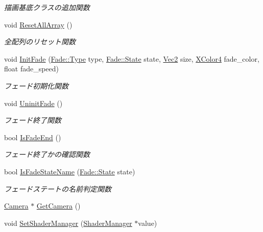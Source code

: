 \begin{DoxyCompactItemize}
\begin{DoxyCompactList}\small\item\em 描画基底クラスの追加関数 \end{DoxyCompactList}\item 
void \mbox{\hyperlink{class_back_buffer_a04e942576ac5de94d16764d347111234}{Reset\+All\+Array}} ()
\begin{DoxyCompactList}\small\item\em 全配列のリセット関数 \end{DoxyCompactList}\item 
void \mbox{\hyperlink{class_back_buffer_add3a034c7758dc6a72bb4582bf6ce78e}{Init\+Fade}} (\mbox{\hyperlink{class_fade_ac06f27215b454aa05b93c236476d6e80}{Fade\+::\+Type}} type, \mbox{\hyperlink{class_fade_ae77826bf3ff2ab95fb7b3b6f95cba80a}{Fade\+::\+State}} state, \mbox{\hyperlink{_vector3_d_8h_a5ef6e95dfc5f9d3820b71772d99bbc25}{Vec2}} size, \mbox{\hyperlink{_vector3_d_8h_a680c30c4a07d86fe763c7e01169cd6cc}{X\+Color4}} fade\+\_\+color, float fade\+\_\+speed)
\begin{DoxyCompactList}\small\item\em フェード初期化関数 \end{DoxyCompactList}\item 
void \mbox{\hyperlink{class_back_buffer_ad3d3626427f53f060f5057ea6a22cac6}{Uninit\+Fade}} ()
\begin{DoxyCompactList}\small\item\em フェード終了関数 \end{DoxyCompactList}\item 
bool \mbox{\hyperlink{class_back_buffer_aab8b2f4a0fdbadccdd9413c12830a377}{Is\+Fade\+End}} ()
\begin{DoxyCompactList}\small\item\em フェード終了かの確認関数 \end{DoxyCompactList}\item 
bool \mbox{\hyperlink{class_back_buffer_a1c13a0de1f95b8f2fea929e9306d426a}{Is\+Fade\+State\+Name}} (\mbox{\hyperlink{class_fade_ae77826bf3ff2ab95fb7b3b6f95cba80a}{Fade\+::\+State}} state)
\begin{DoxyCompactList}\small\item\em フェードステートの名前判定関数 \end{DoxyCompactList}\item 
\mbox{\hyperlink{class_camera}{Camera}} $\ast$ \mbox{\hyperlink{class_back_buffer_addd0da33667c19cfba7f1d81009486f2}{Get\+Camera}} ()
\item 
void \mbox{\hyperlink{class_back_buffer_a44566449a4df988cb1cfe5ffbb0455cc}{Set\+Shader\+Manager}} (\mbox{\hyperlink{class_shader_manager}{Shader\+Manager}} $\ast$value)
\end{DoxyCompactItemize}
